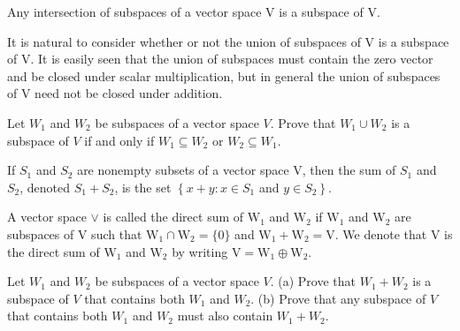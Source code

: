 	\begin{thm*}
		Any intersection of subspaces of a vector space $\mathrm{V}$ is a subspace of $\mathrm{V}$.
	\end{thm*}
	\begin{warn}[Notice :]
		It is natural to consider whether or not the union of subspaces of V is a subspace of V. It is easily seen that the union of subspaces must contain the zero vector and be closed under scalar multiplication, but in general the union of subspaces of V need not be closed under addition.
	\end{warn}
	
	\newpage
	
	\begin{example}
		Let \(W_{1}\) and \(W_{2}\) be subspaces of a vector space \(V .\) Prove that \(W_{1} \cup W_{2}\)
is a subspace of \(V\) if and only if \(W_{1} \subseteq W_{2}\) or \(W_{2} \subseteq W_{1} .\)
\begin{sol*}
	
\end{sol*}
	\end{example}
	\begin{defn}
		If \(S_{1}\) and \(S_{2}\) are nonempty subsets of a vector space \(\mathrm{V}\), then
the sum of \(S_{1}\) and \(S_{2}\), denoted \(S_{1}+S_{2}\), is the set \(\left\{x+y: x \in S_{1}\right.\) and \(\left.y \in S_{2}\right\}\).

	\end{defn}
	
	\begin{defn}
	A vector space \(\vee\) is called the direct sum of \(\mathrm{W}_{1}\) and \(\mathrm{W}_{2}\) if
\(\mathrm{W}_{1}\) and \(\mathrm{W}_{2}\) are subspaces of \(\mathrm{V}\) such that \(\mathrm{W}_{1} \cap \mathrm{W}_{2}=\{0\}\) and \(\mathrm{W}_{1}+\mathrm{W}_{2}=\mathrm{V}\).
We denote that \(\mathrm{V}\) is the direct sum of \(\mathrm{W}_{1}\) and \(\mathrm{W}_{2}\) by writing \(\mathrm{V}=\mathrm{W}_{1} \oplus \mathrm{W}_{2}\).
	\end{defn}
	
	\begin{example}
		Let \(W_{1}\) and \(W_{2}\) be subspaces of a vector space \(V\).
(a) Prove that \(W_{1}+W_{2}\) is a subspace of \(V\) that contains both \(W_{1}\) and
\(W_{2}\).
(b) Prove that any subspace of \(V\) that contains both \(W_{1}\) and \(W_{2}\) must
also contain \(W_{1}+W_{2}\).
	\begin{sol*}
		
	\end{sol*}
	\end{example}
	
